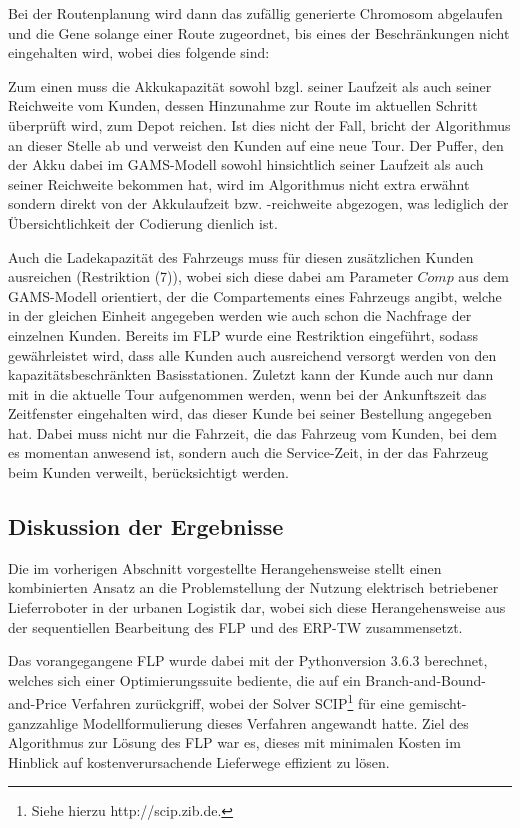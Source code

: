 \documentclass[a4paper,12pt,parskip,bibtotoc,liststotoc]{article}
\begin{document}
Bei der Routenplanung wird dann das zufällig generierte Chromosom abgelaufen und die Gene solange einer Route zugeordnet, bis eines der Beschränkungen nicht eingehalten wird, wobei dies folgende sind:
 
Zum einen muss die Akkukapazität sowohl bzgl. seiner Laufzeit als auch seiner Reichweite vom Kunden, dessen Hinzunahme zur Route im aktuellen Schritt überprüft wird, zum Depot reichen. 
Ist dies nicht der Fall, bricht der Algorithmus an dieser Stelle ab und verweist den Kunden auf eine neue Tour.
Der Puffer, den der Akku dabei im GAMS-Modell sowohl hinsichtlich seiner Laufzeit als auch seiner Reichweite bekommen hat, wird im Algorithmus nicht extra erwähnt sondern direkt von der Akkulaufzeit bzw. -reichweite abgezogen, was lediglich der Übersichtlichkeit der Codierung dienlich ist.

Auch die Ladekapazität des Fahrzeugs muss für diesen zusätzlichen Kunden ausreichen (Restriktion (7)), wobei sich diese dabei am Parameter $Comp$ aus dem GAMS-Modell orientiert, der die Compartements eines Fahrzeugs angibt, welche in der gleichen Einheit angegeben werden wie auch schon die Nachfrage der einzelnen Kunden.
Bereits im FLP wurde eine Restriktion eingeführt, sodass gewährleistet wird, dass alle Kunden auch ausreichend versorgt werden von den kapazitätsbeschränkten Basisstationen.
Zuletzt kann der Kunde auch nur dann mit in die aktuelle Tour aufgenommen werden, wenn bei der Ankunftszeit das Zeitfenster eingehalten wird, das dieser Kunde bei seiner Bestellung angegeben hat.
Dabei muss nicht nur die Fahrzeit, die das Fahrzeug vom Kunden, bei dem es momentan anwesend ist, sondern auch die Service-Zeit, in der das Fahrzeug beim Kunden verweilt, berücksichtigt werden.


\subsection{Diskussion der Ergebnisse}

Die im vorherigen Abschnitt vorgestellte Herangehensweise stellt einen kombinierten Ansatz an die Problemstellung der Nutzung elektrisch betriebener Lieferroboter in der urbanen Logistik dar, wobei sich diese Herangehensweise aus der sequentiellen Bearbeitung des FLP und des ERP-TW zusammensetzt.

Das vorangegangene FLP wurde dabei mit der Pythonversion 3.6.3 berechnet, welches sich einer Optimierungssuite bediente, die auf ein Branch-and-Bound-and-Price Verfahren zurückgriff, wobei der Solver SCIP\footnote{Siehe hierzu http://scip.zib.de.} für eine gemischt-ganzzahlige Modellformulierung dieses Verfahren angewandt hatte.
Ziel des Algorithmus zur Lösung des FLP war es, dieses mit minimalen Kosten im Hinblick auf kostenverursachende Lieferwege effizient zu lösen.
\end{document}
